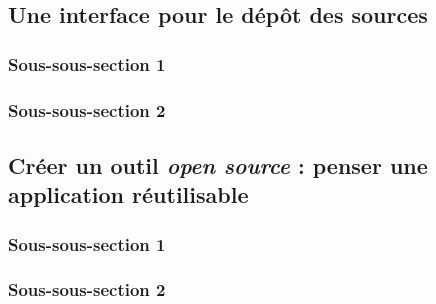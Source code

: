 
\subsection{Une interface pour le dépôt des sources}
    \subsubsection{Sous-sous-section 1}
    
    \subsubsection{Sous-sous-section 2}
    
    
    \subsection{Créer un outil \textit{open source} : penser une application réutilisable}
        \subsubsection{Sous-sous-section 1}


        \subsubsection{Sous-sous-section 2}

